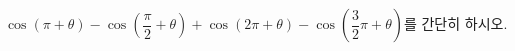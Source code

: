 $\cos(\pi+\theta)-\cos\left(\dfrac{\pi}{2}+\theta\right)+\cos(2\pi+\theta)-\cos\left(\dfrac{3}{2}\pi+\theta\right)$를 간단히 하시오.
